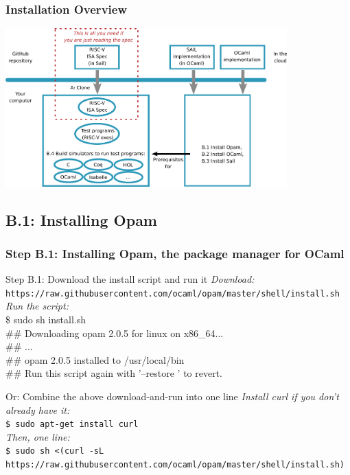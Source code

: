 \documentclass[aspectratio=169]{beamer}
\newcommand{\hm}{\hspace*{1em}}
\newcommand{\scripttt}{\scriptsize\tt}
\begin{document}
\begin{frame}
  \frametitle{Installation Overview}

  \centering
  \includegraphics[height=2.4in]{Figures/Fig_Installation_Overview.png}
\end{frame}



\subsection{B.1: Installing Opam}

\begin{frame}
  \frametitle{Step B.1: Installing Opam, the package manager for OCaml}

  \begin{block}{Step B.1: Download the install script and run it}
    {\scriptsize \emph{Download:} {\tt https://raw.githubusercontent.com/ocaml/opam/master/shell/install.sh}} \\
    {\scriptsize \emph{Run the script:} \\
      \hm{}\$ sudo sh install.sh \\
      \hm{}\#\# Downloading opam 2.0.5 for linux on x86\_64... \\
      \hm{}\#\# ... \\
      \hm{}\#\# opam 2.0.5 installed to /usr/local/bin \\
      \hm{}\#\# Run this script again with '--restore ' to revert.}
  \end{block}

  \begin{block}{Or: Combine the above download-and-run into one line}
    {\scriptsize \emph{Install curl if you don't already have it:}} \\
    {\scripttt\hm{}\$ sudo apt-get install curl} \\
    {\scriptsize \emph{Then, one line:}} \\
    {\scripttt\hm{}\$ sudo sh <(curl -sL https://raw.githubusercontent.com/ocaml/opam/master/shell/install.sh)}
  \end{block}
\end{frame}
\end{document}
